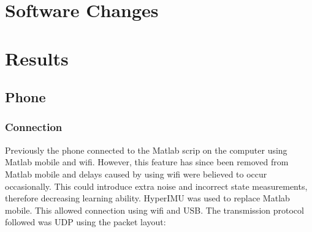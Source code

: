 \documentclass[twoside,twocolumn,12pt]{article}
\begin{document}
\section{Software Changes}


\clearpage
\section{Results}
\subsection{Phone}
\subsubsection{Connection}
Previously the phone connected to the Matlab scrip on the computer using Matlab mobile and wifi. However, this feature has since been removed from Matlab mobile and delays caused by using wifi were believed to occur occasionally. This could introduce extra noise and incorrect state measurements, therefore decreasing learning ability.
\newline
HyperIMU \cite{ianovir} was used to replace Matlab mobile. This allowed connection using wifi and USB. The transmission protocol followed was UDP using the packet layout:
\end{document}
